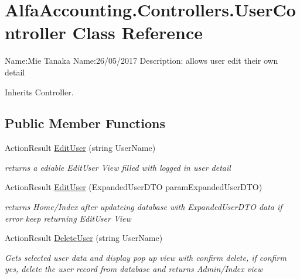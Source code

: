 \hypertarget{class_alfa_accounting_1_1_controllers_1_1_user_controller}{}\section{Alfa\+Accounting.\+Controllers.\+User\+Controller Class Reference}
\label{class_alfa_accounting_1_1_controllers_1_1_user_controller}


Name\+:Mie Tanaka Name\+:26/05/2017 Description\+: allows user edit their own detail  




Inherits Controller.

\subsection*{Public Member Functions}
\begin{DoxyCompactItemize}
\item 
Action\+Result \hyperlink{class_alfa_accounting_1_1_controllers_1_1_user_controller_a31fc4c591dbaf5dc9202d42601c59233}{Edit\+User} (string User\+Name)
\begin{DoxyCompactList}\small\item\em returns a ediable Edit\+User View filled with logged in user detail \end{DoxyCompactList}\item 
Action\+Result \hyperlink{class_alfa_accounting_1_1_controllers_1_1_user_controller_aba377f7d0cebab4e38359d6082fe3845}{Edit\+User} (Expanded\+User\+D\+TO param\+Expanded\+User\+D\+TO)
\begin{DoxyCompactList}\small\item\em returns Home/\+Index after updateing database with Expanded\+User\+D\+TO data if error keep returning Edit\+User View \end{DoxyCompactList}\item 
Action\+Result \hyperlink{class_alfa_accounting_1_1_controllers_1_1_user_controller_ae790d18ac9ac914e2e6cde9174b0f03b}{Delete\+User} (string User\+Name)
\begin{DoxyCompactList}\small\item\em Gets selected user data and display pop up view with confirm delete, if confirm yes, delete the user record from database and returns Admin/\+Index view \end{DoxyCompactList}\end{DoxyCompactItemize}
